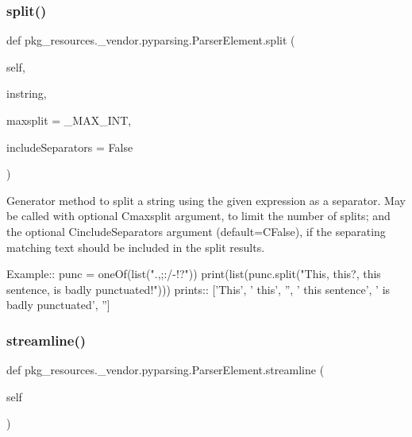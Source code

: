 \subsubsection{\texorpdfstring{split()}{split()}}
{\footnotesize\ttfamily def pkg\+\_\+resources.\+\_\+vendor.\+pyparsing.\+Parser\+Element.\+split (\begin{DoxyParamCaption}\item[{}]{self,  }\item[{}]{instring,  }\item[{}]{maxsplit = {\ttfamily \+\_\+MAX\+\_\+INT},  }\item[{}]{include\+Separators = {\ttfamily False} }\end{DoxyParamCaption})}

\begin{DoxyVerb}Generator method to split a string using the given expression as a separator.
May be called with optional C{maxsplit} argument, to limit the number of splits;
and the optional C{includeSeparators} argument (default=C{False}), if the separating
matching text should be included in the split results.

Example::        
    punc = oneOf(list(".,;:/-!?"))
    print(list(punc.split("This, this?, this sentence, is badly punctuated!")))
prints::
    ['This', ' this', '', ' this sentence', ' is badly punctuated', '']
\end{DoxyVerb}
 \mbox{\label{classpkg__resources_1_1__vendor_1_1pyparsing_1_1ParserElement_adf958ac597bae4beb3a1c91a638f807f}} 
\subsubsection{\texorpdfstring{streamline()}{streamline()}}
{\footnotesize\ttfamily def pkg\+\_\+resources.\+\_\+vendor.\+pyparsing.\+Parser\+Element.\+streamline (\begin{DoxyParamCaption}\item[{}]{self }\end{DoxyParamCaption})}

\mbox{\label{classpkg__resources_1_1__vendor_1_1pyparsing_1_1ParserElement_a97cc767ada83556a906a749714ccb9a7}} 
